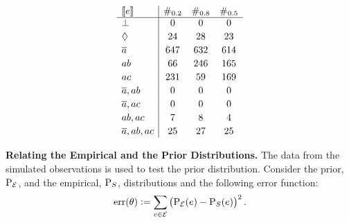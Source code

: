 \documentclass{article}
\begin{document}
\begin{table}[t]
	\begin{center}
		\[
			\begin{array}{l|ccc}
				\left\llbracket e \right\rrbracket
				 & \#_{0.2}
				 & \#_{0.8}
				 & \#_{0.5}
				\\
				\hline
				\bot
				 & 0
				 & 0
				 & 0        \\[2pt]
				\Diamond
				 & 24
				 & 28
				 & 23       \\[2pt]
				\overline{a}
				 & 647
				 & 632
				 & 614      \\[2pt]
				ab
				 & 66
				 & 246
				 & 165      \\[2pt]
				ac
				 & 231
				 & 59
				 & 169      \\[2pt]
				\overline{a}, ab
				 & 0
				 & 0
				 & 0        \\[2pt]
				\overline{a}, ac
				 & 0
				 & 0
				 & 0
				\\[2pt]
				ab, ac
				 & 7
				 & 8
				 & 4        \\[2pt]
				\overline{a}, ab, ac
				 & 25
				 & 27
				 & 25\end{array}
		\]
	\end{center}

	\caption{\emph{Experiments 2 and 3.} Results from experiments, each with \(n=1000\) samples generated following the \emph{Model+Noise} procedure, with parameters \(\alpha = 0.1, \beta = 0.3, \gamma = 0.8\) (Experiment 2:
	bias to \(ab\).) and \(\gamma=0.5\) (Experiment 3: balanced \(ab\) and \(ac\).).  Empirical distributions are represented by the random variables \(S_{0.8}\) and \(S_{0.5}\) respectively.  Data from experience \cref{tab:sbf.example} is also included, and denoted by \(S_{0.2}\), to provide reference.  Columns \(\#_{0.2}\), \(\#_{0.8}\) and \(\#_{0.5}\)
	contain \(\#\set{S_{0.2} \in \class{e}}\), \(\#\set{S_{0.8} \in \class{e}}\)
	and \(\#\set{S_{0.5} \in \class{e}}\), the respective number of events in each class.}\label{tab:sbf.examples.2.3}
\end{table}

\noindent\textbf{Relating the Empirical and the Prior Distributions.}
The data from the simulated observations is used to test the prior
distribution.  Consider the prior, \(\mathrm{P}_{{\cal E}}\), and the empirical,
\(\mathrm{P}_{S}\), distributions and the following error function:
\begin{equation}
	\err{\theta} := \sum_{e\in\EVENTSset} \del{\prE\at{e} - \prd{S}\at{e}}^2.\label{eq:err.e.s}
\end{equation}
\end{document}
